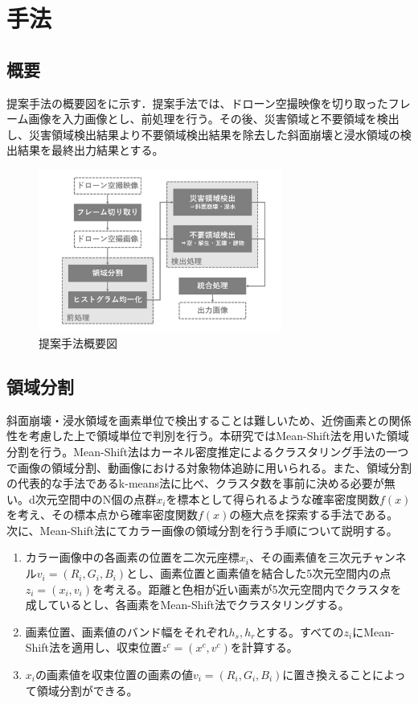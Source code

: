 \documentclass[../Thesis]{subfiles}
\begin{document}
\chapter{手法}
\section{概要}
  提案手法の概要図をに示す．提案手法では、ドローン空撮映像を切り取ったフレーム画像を入力画像とし、前処理を行う。その後、災害領域と不要領域を検出し、災害領域検出結果より不要領域検出結果を除去した斜面崩壊と浸水領域の検出結果を最終出力結果とする。

  \begin{figure}[h]
		\centering
		\includegraphics[width=8cm]{img/howto.jpg}
		\caption{提案手法概要図}
		\label{img01}
  \end{figure}
  

\section{領域分割}
  斜面崩壊・浸水領域を画素単位で検出することは難しいため、近傍画素との関係性を考慮した上で領域単位で判別を行う。本研究ではMean-Shift法を用いた領域分割を行う。Mean-Shift法はカーネル密度推定によるクラスタリング手法の一つで画像の領域分割、動画像における対象物体追跡に用いられる。また、領域分割の代表的な手法であるk-means法に比べ、クラスタ数を事前に決める必要が無い。d次元空間中のN個の点群$x_i$を標本として得られるような確率密度関数$f(x)$を考え、その標本点から確率密度関数$f(x)$の極大点を探索する手法である。
  次に、Mean-Shift法にてカラー画像の領域分割を行う手順について説明する。

  \begin{enumerate}
    \item カラー画像中の各画素の位置を二次元座標$x_i$、その画素値を三次元チャンネル$v_i=(R_i,G_i,B_i)$とし、画素位置と画素値を結合した5次元空間内の点$z_i=(x_i,v_i)$を考える。距離と色相が近い画素が5次元空間内でクラスタを成しているとし、各画素をMean-Shift法でクラスタリングする。
    \item 画素位置、画素値のバンド幅をそれぞれ$h_s,h_r$とする。すべての$z_i$にMean-Shift法を適用し、収束位置$z^c=(x^c,v^c)$を計算する。
    \item $x_i$の画素値を収束位置の画素の値$v_i=(R_i,G_i,B_i)$に置き換えることによって領域分割ができる。
  \end{enumerate}
  
\end{document}
